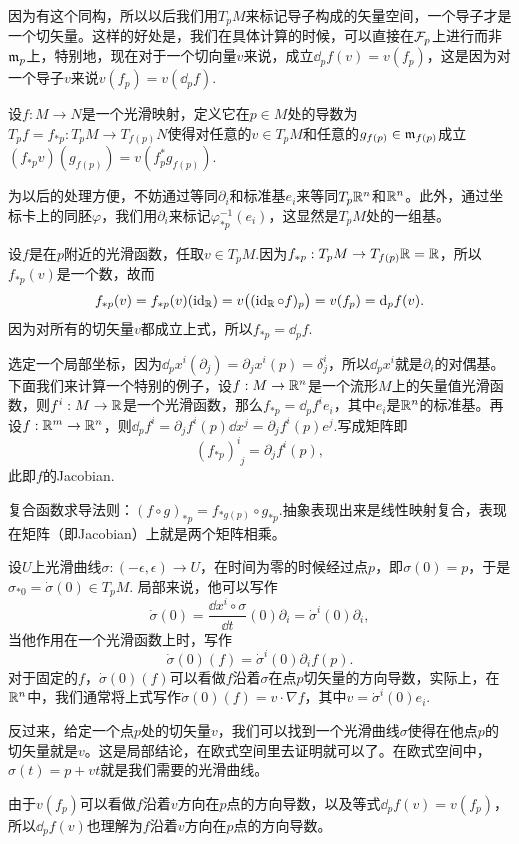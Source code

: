 因为有这个同构，所以以后我们用$T_pM$来标记导子构成的矢量空间，一个导子才是一个切矢量。这样的好处是，我们在具体计算的时候，可以直接在$\mathcal{F}_p$上进行而非$\mathfrak{m}_p$上，特别地，现在对于一个切向量$v$来说，成立$\dd_pf(v)=v(f_p)$，这是因为对一个导子$v$来说$v(f_p)=v(\dd_pf)$.

\para 设$f:M\to N$是一个光滑映射，定义它在$p\in M$处的导数为$T_pf=f_{*p}:T_pM\to T_{f(p)}N$使得对任意的$v\in T_p M$和任意的$g_{f(p)}\in \mathfrak{m}_{f(p)}$成立$(f_{*p}v)(g_{f(p)})=v(f_p^*g_{f(p)})$.

为以后的处理方便，不妨通过等同$\partial_i$和标准基$e_i$来等同$T_p\mathbb{R}^n$和$\mathbb{R}^n$。此外，通过坐标卡上的同胚$\varphi$，我们用$\partial_i$来标记$\varphi^{-1}_{*p}(e_i)$，这显然是$T_pM$处的一组基。


\para 设$f$是在$p$附近的光滑函数，任取$v\in T_pM$.因为$f_{*p}:T_pM\to T_{f(p)}\mathbb{R}=\mathbb{R}$，所以$f_{*p}(v)$是一个数，故而
	\[
		f_{*p}(v)=f_{*p}(v)(\operatorname{id}_{\mathbb{R}})=v\bigl((\operatorname{id}_{\mathbb{R}}\circ f)_p\bigr)=v(f_p)=\mathrm{d}_p f(v).
	\]
	因为对所有的切矢量$v$都成立上式，所以$f_{*p}=\dd_p f$.

选定一个局部坐标，因为$\dd_p x^i(\partial_j)=\partial_jx^i(p)=\delta^i_j$，所以$\dd_p x^i$就是$\partial_i$的对偶基。下面我们来计算一个特别的例子，设$f:M\to \mathbb{R}^n$是一个流形$M$上的矢量值光滑函数，则$f^i:M\to \mathbb{R}$是一个光滑函数，那么$f_{*p}=\dd_pf^i e_i$，其中$e_i$是$\mathbb{R}^n$的标准基。再设$f:\mathbb{R}^m\to \mathbb{R}^n$，则$\dd_pf^i=\partial_j f^i(p) \dd x^j=\partial_j f^i(p) e^j$.写成矩阵即
\[
	(f_{*p})^{i}_{\phantom{i}j}=\partial_j f^i(p),
\]
此即$f$的Jacobian.

\para 复合函数求导法则：$(f\circ g)_{*p}=f_{*g(p)}\circ g_{*p}$.抽象表现出来是线性映射复合，表现在矩阵（即Jacobian）上就是两个矩阵相乘。

\para 设$U$上光滑曲线$\sigma:(-\epsilon,\epsilon)\to U$，在时间为零的时候经过点$p$，即$\sigma(0)=p$，于是$\sigma_{*0}=\dot\sigma(0)\in T_pM$. 局部来说，他可以写作
\[
	\dot{\sigma}(0)=\frac{\dd x^i\circ \sigma}{\dd t}(0)\partial_i=\dot \sigma^i(0)\partial_i,
\]
当他作用在一个光滑函数上时，写作
\[
	\dot{\sigma}(0)(f)=\dot \sigma^i(0)\partial_if(p).
\]
对于固定的$f$，$\dot{\sigma}(0)(f)$可以看做$f$沿着$\sigma$在点$p$切矢量的方向导数，实际上，在$\mathbb{R}^n$中，我们通常将上式写作$\dot{\sigma}(0)(f)=v\cdot \nabla f$，其中$v=\dot \sigma^i(0)e_i$.

\para 反过来，给定一个点$p$处的切矢量$v$，我们可以找到一个光滑曲线$\sigma$使得在他点$p$的切矢量就是$v$。这是局部结论，在欧式空间里去证明就可以了。在欧式空间中，$\sigma(t)=p+vt$就是我们需要的光滑曲线。

\para 由于$v(f_p)$可以看做$f$沿着$v$方向在$p$点的方向导数，以及等式$\dd_pf(v)=v(f_p)$，所以$\dd_pf(v)$也理解为$f$沿着$v$方向在$p$点的方向导数。

